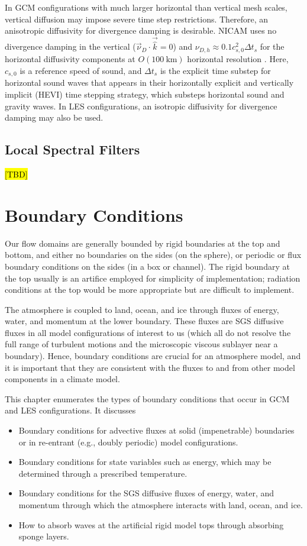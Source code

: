 \documentclass{report}
\begin{document}
In GCM configurations with much larger horizontal than vertical mesh scales, vertical diffusion may impose severe time step restrictions. Therefore, an anisotropic diffusivity for divergence damping is desirable. NICAM uses no divergence damping in the vertical ($\vec{\nu}_D \cdot \vec{\hat k}=0$) and $\nu_{D, h} \approx 0.1 c_{s, 0}^2 \Delta t_s$ for the horizontal diffusivity components at $O(100~\mathrm{km})$ horizontal resolution \citep{tomita:2004}. Here, $c_{s,0}$ is a reference speed of sound, and $\Delta t_s$ is the explicit time substep for horizontal sound waves that appears in their horizontally explicit and vertically implicit (HEVI) time stepping strategy, which substeps horizontal sound and gravity waves. In LES configurations, an isotropic diffusivity for divergence damping may also be used.

\section{Local Spectral Filters}

\hl{[TBD]}

\chapter{Boundary Conditions}\label{c:boundary_conditions}

Our flow domains are generally bounded by rigid boundaries at the top and bottom, and either no boundaries on the sides (on the sphere), or periodic or flux boundary conditions on the sides (in a box or channel). The rigid boundary at the top usually is an artifice employed for simplicity of implementation; radiation conditions at the top would be more appropriate but are difficult to implement. 

The atmosphere is coupled to land, ocean, and ice through fluxes of energy, water, and momentum at the lower boundary. These fluxes are SGS diffusive fluxes in all model configurations of interest to us (which all do not resolve the full range of turbulent motions and the microscopic viscous sublayer near a boundary). Hence, boundary conditions are crucial for an atmosphere model, and it is important that they are consistent with the fluxes to and from other model components in a climate model.

This chapter enumerates the types of boundary conditions that occur in GCM and LES configurations. It discusses
\begin{itemize}
    \item Boundary conditions for advective fluxes at solid (impenetrable) boundaries or in re-entrant (e.g., doubly periodic) model configurations.
    \item Boundary conditions for state variables such as energy, which may be determined through a prescribed temperature.
    \item Boundary conditions for the SGS diffusive fluxes of energy, water, and momentum through which the atmosphere interacts with land, ocean, and ice.
    \item How to absorb waves at the artificial rigid model tops through absorbing sponge layers.
\end{itemize}
\end{document}
